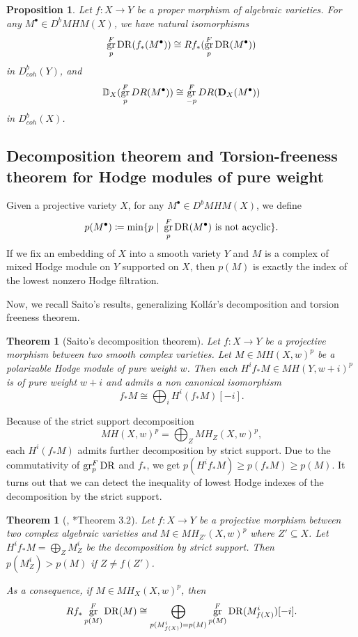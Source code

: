 \documentclass[11pt]{amsart}
\newtheorem{theorem}[equation]{Theorem}
\newtheorem{proposition}[equation]{Proposition}
\theoremstyle{definition}
\theoremstyle{plain}
\newcommand{\bD}{\mathbf D}
\newcommand{\DD}{\mathbb D}
\DeclareMathOperator{\DR}{DR}
\DeclareMathOperator{\gr}{{\rm gr}}
\newcommand{\Kollar}{Koll\'ar}
\begin{document}
\begin{proposition} \label{proposition: grDR and f_* commute}
    Let $f: X\to Y$ be a proper morphism of algebraic varieties. For any $M^\bullet \in D^b MHM(X)$, we have natural isomorphisms 
    \[\gr^F_p \DR ( f_* (M^\bullet)) \cong Rf_* ( \gr^F_p \DR(M^\bullet))\]
    in $D_{coh}^b(Y)$, and 
    \[\DD_X(\gr^F_p DR(M^\bullet)) \cong \gr^F_{-p} DR (\bD_X(M^\bullet))\]
    in $D_{coh}^b(X)$. 
\end{proposition}

\subsection{Decomposition theorem and Torsion-freeness theorem for Hodge modules of pure weight}

Given a projective variety $X$, for any $M^\bullet\in D^b MHM(X)$, we define 
\[p(M^\bullet) \coloneqq \min \{p\  |\  \gr^F_p \DR(M^\bullet) \text{ is not acyclic}\}.\] 
If we fix an embedding of $X$ into a smooth variety $Y$ and $M$ is a complex of mixed Hodge module on $Y$ supported on $X$, then $p(M)$ is exactly the index of the lowest nonzero Hodge filtration.

Now, we recall Saito's results, generalizing \Kollar{}'s decomposition and torsion freeness theorem.

\begin{theorem} [Saito's decomposition theorem] \label{theorem: saito decomposition} Let $f: X\to Y$ be a projective morphism between two smooth complex varieties. Let $M\in MH(X, w)^p$ be a polarizable Hodge module of pure weight $w$. Then each $H^i f_* M \in MH(Y, w+i)^p$ is of pure weight $w+i$ and admits a non canonical isomorphism 
\[f_* M \cong \bigoplus_{i} H^i(f_* M)[-i].\]
\end{theorem}

Because of the strict support decomposition
\[MH(X, w)^p = \bigoplus_Z MH_Z(X, w)^p,\]
each $H^i(f_* M)$ admits further decomposition by strict support. Due to the commutativity of $\gr^F_p \DR$ and $f_*$, we get $p(H^i f_* M) \ge p(f_*M) \ge p(M)$. It turns out that we can detect the inequality of lowest Hodge indexes of the decomposition by the strict support. 

\begin{theorem} [{\cite[Proposition 2.6]{Saito_Kollar_conjecture}, \cite{Saito_Kollar_conjecture}*{Theorem 3.2}}] \label{theorem: saito torsion-freeness}
    Let $f: X\to Y$ be a projective morphism between two complex algebraic varieties and $M\in MH_{Z'}(X, w)^p$ where $Z'\subseteq X$. Let $H^i f_* M = \bigoplus_{Z} M^i_{Z}$ be the decomposition by strict support. Then $p(M^i_Z) > p(M)$ if $Z \neq f(Z')$.

    As a consequence, if $M\in MH_X(X, w)^p$, then 
    \[Rf_* \gr^F_{p(M)} \DR (M) \cong \bigoplus_{p(M^i_{f(X)}) = p(M)} \gr^F_{p(M)} \DR (M^i_{f(X)})[-i].\]
\end{theorem}
\end{document}
